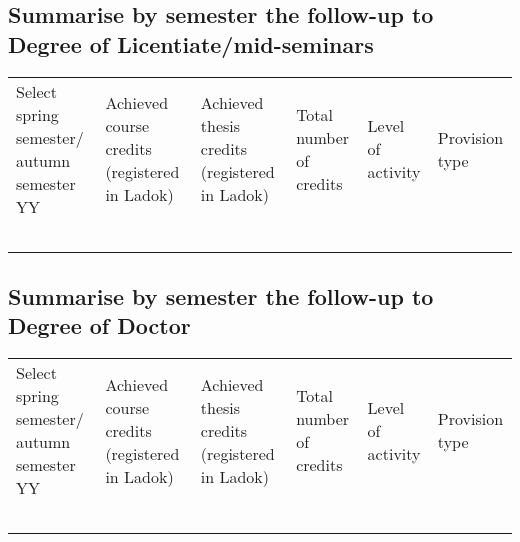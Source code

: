 \subsection{Summarise by semester the follow-up to Degree of Licentiate/mid-seminars}
{\scriptsize
\begin{tabular}{p{2.2cm}p{2.2cm}p{2.2cm}p{2.2cm}p{2.2cm}p{2.2cm}}
\raggedright Select spring semester/ autumn semester YY &
\raggedright Achieved course credits (registered in Ladok) &
\raggedright Achieved thesis credits (registered in Ladok) &
\raggedright Total number of credits &
\raggedright Level of activity &
Provision type\\
\rowcolor[gray]{0.95} & & & & & \\
\rowcolor[gray]{0.95} & & & & & \\
\rowcolor[gray]{0.95} & & & & & \\
\rowcolor[gray]{0.95} & & & & & \\
\rowcolor[gray]{0.95} & & & & & \\
\end{tabular}}

\subsection{Summarise by semester the follow-up to Degree of Doctor}
{\scriptsize
\begin{tabular}{p{2.2cm}p{2.2cm}p{2.2cm}p{2.2cm}p{2.2cm}p{2.2cm}}
\raggedright Select spring semester/ autumn semester YY &
\raggedright Achieved course credits (registered in Ladok) &
\raggedright Achieved thesis credits (registered in Ladok) &
\raggedright Total number of credits &
\raggedright Level of activity &
Provision type\\
\rowcolor[gray]{0.95} & & & & & \\
\rowcolor[gray]{0.95} & & & & & \\
\rowcolor[gray]{0.95} & & & & & \\
\rowcolor[gray]{0.95} & & & & & \\
\rowcolor[gray]{0.95} & & & & & \\
\end{tabular}}

\clearpage
